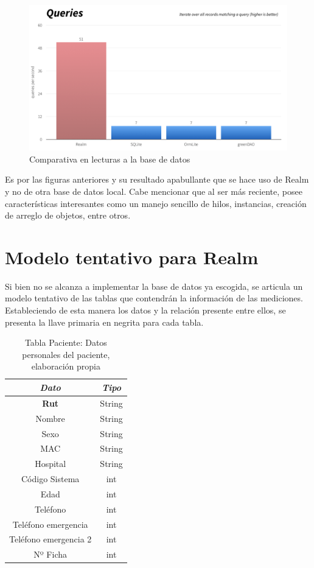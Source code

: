 \begin{figure}[H]
	\centering
	\includegraphics[scale=0.4]{figuras/proto2/queries.png}
	\caption{Comparativa en lecturas a la base de datos \cite{realm_android}}
	\label{queries}
\end{figure}

Es por las figuras anteriores y su resultado apabullante que se hace uso de Realm y no de otra base de datos local. Cabe mencionar que al ser más reciente, posee características interesantes como un manejo sencillo de hilos, instancias, creación de arreglo de objetos, entre otros.

\newpage

\section{Modelo tentativo para Realm}

Si bien no se alcanza a implementar la base de datos ya escogida, se articula un modelo tentativo de las tablas que contendrán la información de las mediciones. Estableciendo de esta manera los datos y la relación presente entre ellos, se presenta la llave primaria en negrita para cada tabla.

\begin{table}[H]
	\centering
	\begin{tabular}{| c | c |}
		\hline
		\multicolumn{1}{|c|}{\textit{Dato}}&
		\multicolumn{1}{c|}{\textit{Tipo}}\\ \hline
		\textbf{Rut}  & String   \\ \hline
		Nombre  & String  \\ \hline
		Sexo & String  \\ \hline
		MAC & String  \\ \hline
		Hospital & String  \\ \hline
		Código Sistema & int  \\ \hline
		Edad & int  \\ \hline
		Teléfono & int  \\ \hline
		Teléfono emergencia & int  \\ \hline
		Teléfono emergencia 2 & int  \\ \hline
		Nº Ficha & int  \\ \hline
	\end{tabular}
	\caption{Tabla Paciente: Datos personales del paciente, elaboración propia}
	\label{tabla_paciente}
\end{table}

